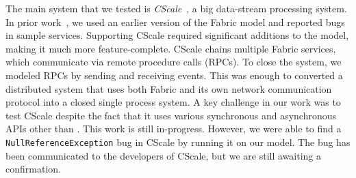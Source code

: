 The main system that we tested is \emph{CScale}~\cite{faleiro2012},
a big data-stream processing system. In prior work~\cite{deligiannis2015psharp}, 
we used an earlier version of the Fabric model and reported bugs in sample services.
Supporting CScale required significant additions to the model, making it much more
feature-complete.
CScale chains multiple Fabric services, which communicate via remote procedure calls (RPCs).
To close the system, we modeled RPCs 
by sending and receiving \psharp{} events.
This was enough to converted a distributed system
that uses both Fabric and its own
network communication protocol
into 
a closed single process system. 
A key challenge in our work
was to test CScale despite the fact that it
uses various synchronous and asynchronous APIs
other than \psharp{}.
This work is still in-progress.
However, we were able to find a \texttt{NullReferenceException}
bug in CScale by running it on our model. The bug has been
communicated to the developers of CScale, but we are still awaiting a
confirmation.











